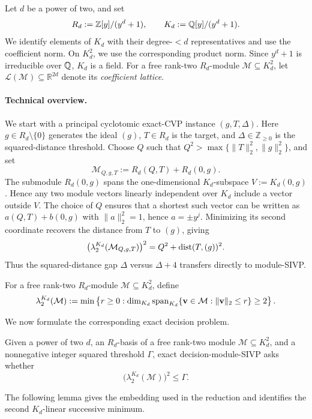 \ifdefined\withModuleSIVP
\else
Let \(d\) be a power of two, and set
\[
 R_d:=\mathbb Z[y]/(y^d+1),
 \qquad
 K_d:=\mathbb Q[y]/(y^d+1).
\]
We identify elements of \(K_d\) with their degree-\(<d\) representatives and
use the coefficient norm.  On \(K_d^2\), we use the corresponding product
norm.  Since \(y^d+1\) is irreducible over \(\mathbb Q\), \(K_d\) is a field.
For a free rank-two \(R_d\)-module
\(\mathcal M\subseteq K_d^2\), let \(\mathcal L(\mathcal M)\subseteq
\mathbb R^{2d}\) denote its \emph{coefficient lattice}.

\paragraph{Technical overview.}
We start with a principal cyclotomic exact-CVP instance
\((g,T,\Delta)\).
Here \(g\in R_d\setminus\{0\}\) generates the ideal \((g)\), \(T\in R_d\) is
the target, and \(\Delta\in\mathbb Z_{\geq0}\) is the squared-distance
threshold.  Choose \(Q\) such that
\(Q^2>\max\{\|T\|_2^2,\|g\|_2^2\}\), and set
\[
 \mathcal M_{Q,g,T}:=R_d(Q,T)+R_d(0,g).
\]
The submodule \(R_d(0,g)\) spans the one-dimensional \(K_d\)-subspace
\(V:=K_d(0,g)\).  Hence any two module vectors linearly independent over
\(K_d\) include a vector outside \(V\).  The choice of \(Q\) ensures that a
shortest such vector can be written as
\(a(Q,T)+b(0,g)\) with \(\|a\|_2^2=1\), hence \(a=\pm y^j\).
Minimizing its second coordinate recovers the
distance from \(T\) to \((g)\), giving
\[
 \bigl(\lambda_2^{K_d}(\mathcal M_{Q,g,T})\bigr)^2
 =Q^2+\operatorname{dist}(T,(g))^2.
\]
Thus the squared-distance gap \(\Delta\) versus \(\Delta+4\) transfers
directly to module-SIVP.
\fi

\ifdefined\withModuleSIVP
\else
For a free rank-two \(R_d\)-module \(\mathcal M\subseteq K_d^2\), define
\[
 \lambda_2^{K_d}(\mathcal M)
 :=\min\left\{r\geq0:
 \dim_{K_d}\operatorname{span}_{K_d}
 \{\mathbf v\in\mathcal M:\|\mathbf v\|_2\leq r\}\geq2
 \right\}.
\]

We now formulate the corresponding exact decision problem.
\begin{definition}
\label{def:module-sivp}
Given a power of two \(d\), an \(R_d\)-basis of a free rank-two
module \(\mathcal M\subseteq K_d^2\), and a nonnegative integer squared
threshold \(\Gamma\), exact decision-module-SIVP asks whether
\[
 \bigl(\lambda_2^{K_d}(\mathcal M)\bigr)^2\leq\Gamma.
\]
\end{definition}
\fi

The following lemma gives the embedding used in the reduction
and identifies the second \(K_d\)-linear successive minimum.

